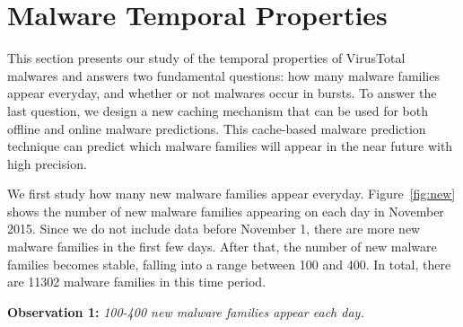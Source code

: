 \section{Malware Temporal Properties}
\label{sec:temporal}

This section presents our study of the temporal properties of VirusTotal malwares
and answers two fundamental questions: 
how many malware families appear everyday, 
and whether or not malwares occur in bursts.
To answer the last question, we design a new caching mechanism 
that can be used for both offline and online malware predictions.
This cache-based malware prediction technique can predict which malware families will appear in the near future with high precision.



We first study how many new malware families appear everyday. 
Figure~\ref{fig:new} shows the number of new malware families appearing on each day in November 2015. 
Since we do not include data before November 1, 
there are more new malware families in the first few days.
After that, the number of new malware families becomes stable, 
falling into a range between 100 and 400. 
In total, there are 11302 malware families in this time period. 

{\bf Observation 1:} 
{\em 100-400 new malware families appear each day.}

%
%





